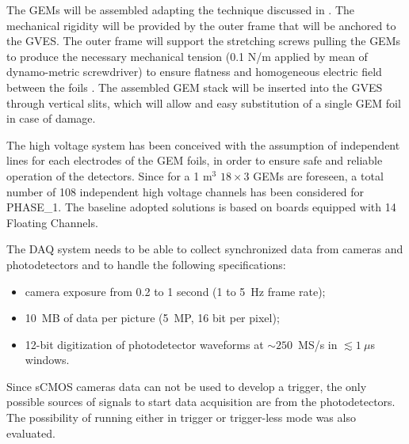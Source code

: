\documentclass[physics,article,submit,moreauthors,pdftex]{Definitions/mdpi}
\begin{document}
The GEMs will be assembled adapting the technique discussed in \cite{Colaleo:2015vsq}. The mechanical rigidity will be provided by the outer frame that will be anchored to the GVES. The outer frame will support the stretching screws pulling the GEMs to produce the necessary mechanical tension (0.1 N/m applied by mean of dynamo-metric screwdriver) to ensure flatness and homogeneous electric field between the foils \cite{Benussi:2015omy}. The assembled GEM stack will be inserted into the GVES through vertical slits, which will allow and easy substitution of a single GEM foil in case of damage.


The high voltage system has been conceived with the assumption of independent lines 
for each electrodes of the GEM foils, in order to ensure safe and reliable 
operation of the detectors. 
Since for a 1 m$^3$ $18 \times 3$ GEMs are foreseen, a total number of 108 independent high voltage channels has been considered for PHASE\_1. The baseline adopted solutions is based on boards equipped with 14 Floating Channels.

The DAQ system needs to be able to collect synchronized data from cameras and photodetectors and to handle the following specifications: 
\begin{itemize}
    \item camera exposure from 0.2 to 1 second (1 to 5~Hz frame rate);
    \item 10~MB of data per picture (5~MP, 16 bit per pixel); 
    \item 12-bit digitization of photodetector waveforms at $\sim 250$~MS/s in $\lesssim 1~\mu$s windows.
\end{itemize}
 Since sCMOS cameras data can not be used to develop a trigger, the only possible sources of signals to start data acquisition are from the photodetectors. The possibility of running either in trigger or trigger-less mode was also evaluated. 
 
\end{document}
